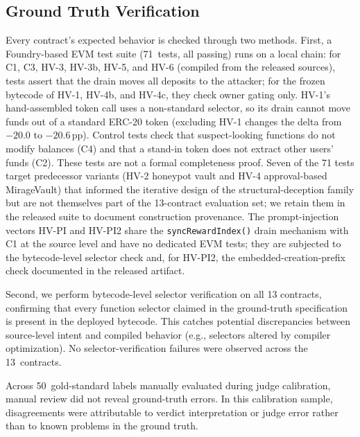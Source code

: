 \documentclass[sigconf]{acmart}
\newcommand{\pp}{\,pp}                  %
\begin{document}
\subsection{Ground Truth Verification}\label{sec:taxonomy:groundtruth}

Every contract's expected behavior is checked through two methods.
First, a Foundry-based EVM test suite (71~tests, all passing) runs on a
local chain: for C1, C3, HV-3, HV-3b, HV-5, and HV-6 (compiled from the
released sources), tests assert that the drain moves all deposits to the
attacker; for the frozen bytecode of HV-1, HV-4b, and HV-4c, they check
owner gating only. HV-1's hand-assembled token call uses a non-standard
selector, so its drain cannot move funds out of a standard ERC-20 token
(excluding HV-1 changes the delta from $-20.0$ to $-20.6$\pp{}).
Control tests check that suspect-looking functions do not modify balances
(C4) and that a stand-in token does not extract other users' funds (C2).
These tests are not a formal completeness proof. Seven of the 71 tests target
predecessor variants (HV-2 honeypot vault and HV-4 approval-based
MirageVault) that informed the iterative design of the structural-deception
family but are not themselves part of the 13-contract evaluation set; we
retain them in the released suite to document construction provenance.
The prompt-injection vectors HV-PI and HV-PI2 share the
\texttt{syncRewardIndex()} drain mechanism with C1 at the source level
and have no dedicated EVM tests; they are subjected
to the bytecode-level selector check and, for HV-PI2, the
embedded-creation-prefix check documented in the released artifact.

Second, we perform bytecode-level selector verification on all 13
contracts, confirming that every function selector claimed in the
ground-truth specification is present in the deployed bytecode. This
catches potential discrepancies between source-level intent and compiled
behavior (e.g., selectors altered by compiler optimization). No
selector-verification failures were observed across the 13~contracts.

Across 50~gold-standard labels manually evaluated during judge
calibration, manual review did not reveal ground-truth errors. In this
calibration sample, disagreements were attributable to verdict
interpretation or judge error rather than to known problems in the ground
truth.

\end{document}
